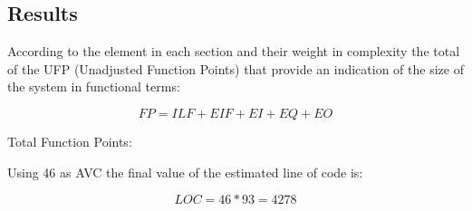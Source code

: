 
\subsection{Results} 
According to the element in each section and their weight in complexity the total of the UFP (Unadjusted Function Points) that provide an indication of the size of the system in functional terms:

\begin{equation}
FP=ILF+EIF+EI+EQ+EO 
\end{equation}

Total Function Points: \textbf{}


Using 46 as AVC the final value of the estimated line of code is:

\begin{equation}
LOC = 46 * 93 = 4278
\end{equation}
